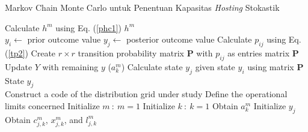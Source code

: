 \addtocounter{algorithm}{-1}
\begin{algorithm}[htbp]
	\caption{Markov Chain Monte Carlo untuk Penentuan Kapasitas \textit{Hosting} Stokastik}
	\begin{algorithmic}[1]
		\State Calculate $\mathit{h^m}$ using Eq. (\ref{phc1})
		\State\Return $\mathit{h^m}$
		\EndFunction\\

		\State{}		
		\State $y_i \gets$ prior outcome value
		\State $y_j \gets$ posterior outcome value
		\State Calculate $p_{ij}$ using Eq. (\ref{tp2})
		\EndFor 		
		\State Create $r\times r$ transition probability matrix $\mathbf{P}$ with $p_{ij}$ as entries
		\State\Return matrix $\mathbf{P}$
		\EndFunction\\

		\State Update $Y$ with remaining $y$
		\EndIf
		\State{}($a^m_k$)
		\State Calculate state $y_j$ given state $y_i$ using matrix $\mathbf{P}$
		\EndFor
		\State\Return State $y_j$
		\EndFunction\\
		
		\State{}
		\State{}
		\State Construct a code of the distribution grid under study
		\State Define the operational limits concerned
		\State Initialize  $m\ :\ m=1$
		\State Initialize  $k\ :\ k=1$
		\State Obtain $a^m_k$
		\State{}
		\State Initialize $y_j$
		\State Obtain $c^m_{j,k}$, $x^m_{j,k}$, and $l^m_{j,k}$
		\State{}
		\State{}
		\State{}
		\State{}
		\State{}
	\end{algorithmic}
\end{algorithm}	
\addtocounter{algorithm}{-1}
